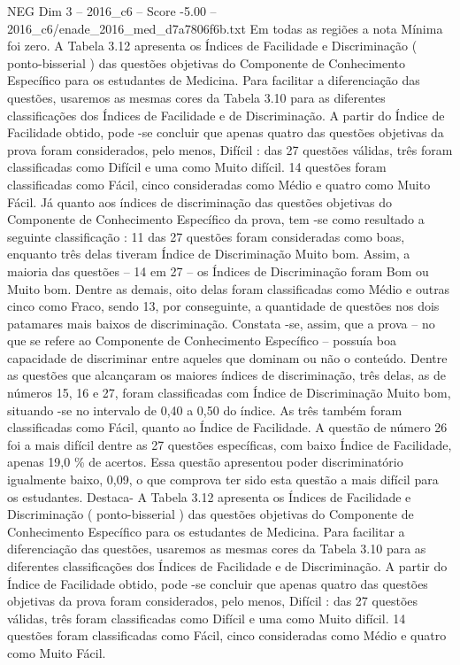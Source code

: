 \begin{textsample}{NEG Dim 3 – 2016\_c6 – Score -5.00 – 2016\_c6/enade\_2016\_med\_d7a7806f6b.txt}
Em todas as regiões a nota Mínima foi zero.
A Tabela 3.12 apresenta os Índices de Facilidade e Discriminação ( ponto-bisserial ) das questões objetivas do Componente de Conhecimento Específico para os estudantes de Medicina.
Para facilitar a diferenciação das questões, usaremos as mesmas cores da Tabela 3.10 para as diferentes classificações dos Índices de Facilidade e de Discriminação.
A partir do Índice de Facilidade obtido, pode -se concluir que apenas quatro das questões objetivas da prova foram considerados, pelo menos, Difícil : das 27 questões válidas, três foram classificadas como Difícil e uma como Muito difícil. 14 questões foram classificadas como Fácil, cinco consideradas como Médio e quatro como Muito Fácil.
Já quanto aos índices de discriminação das questões objetivas do Componente de Conhecimento Específico da prova, tem -se como resultado a seguinte classificação : 11 das 27 questões foram consideradas como boas, enquanto três delas tiveram Índice de Discriminação Muito bom.
Assim, a maioria das questões – 14 em 27 – os Índices de Discriminação foram Bom ou Muito bom.
Dentre as demais, oito delas foram classificadas como Médio e outras cinco como Fraco, sendo 13, por conseguinte, a quantidade de questões nos dois patamares mais baixos de discriminação.
Constata -se, assim, que a prova – no que se refere ao Componente de Conhecimento Específico – possuía boa capacidade de discriminar entre aqueles que dominam ou não o conteúdo.
Dentre as questões que alcançaram os maiores índices de discriminação, três delas, as de números 15, 16 e 27, foram classificadas com Índice de Discriminação Muito bom, situando -se no intervalo de 0,40 a 0,50 do índice.
As três também foram classificadas como Fácil, quanto ao Índice de Facilidade.
A questão de número 26 foi a mais difícil dentre as 27 questões específicas, com baixo Índice de Facilidade, apenas 19,0 \% de acertos.
Essa questão apresentou poder discriminatório igualmente baixo, 0,09, o que comprova ter sido esta questão a mais difícil para os estudantes.
Destaca- A Tabela 3.12 apresenta os Índices de Facilidade e Discriminação ( ponto-bisserial ) das questões objetivas do Componente de Conhecimento Específico para os estudantes de Medicina.
Para facilitar a diferenciação das questões, usaremos as mesmas cores da Tabela 3.10 para as diferentes classificações dos Índices de Facilidade e de Discriminação.
A partir do Índice de Facilidade obtido, pode -se concluir que apenas quatro das questões objetivas da prova foram considerados, pelo menos, Difícil : das 27 questões válidas, três foram classificadas como Difícil e uma como Muito difícil. 14 questões foram classificadas como Fácil, cinco consideradas como Médio e quatro como Muito Fácil.

\end{textsample}
